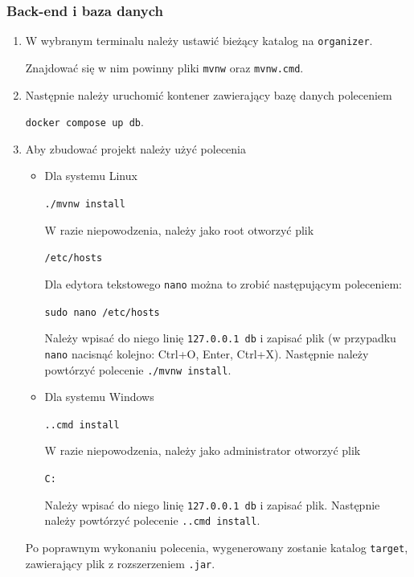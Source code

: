 \documentclass[a4paper,twoside,12pt]{book}
\begin{document}
\subsubsection{Back-end i baza danych}
\begin{enumerate}
   \item W wybranym terminalu należy ustawić bieżący katalog na \texttt{organizer}. 

Znajdować się w nim powinny pliki \texttt{mvnw} oraz \texttt{mvnw.cmd}.
   \item Następnie należy uruchomić kontener zawierający bazę danych poleceniem 

\texttt{docker compose up db}.
   \item Aby zbudować projekt należy użyć polecenia 

   \begin{itemize}
	\item Dla systemu Linux

	\texttt{./mvnw install}
  
  W razie niepowodzenia, należy jako root otworzyć plik 
  
  \texttt{/etc/hosts} 
  
  Dla edytora tekstowego \texttt{nano} można to zrobić następującym poleceniem:
  
  \texttt{sudo nano /etc/hosts} 
  
  Należy wpisać do niego linię \texttt{127.0.0.1 db} i zapisać plik (w przypadku \texttt{nano} nacisnąć kolejno: Ctrl+O, Enter, Ctrl+X). Następnie należy powtórzyć polecenie \texttt{./mvnw install}.

	\item Dla systemu Windows

	\texttt{.\mvnw.cmd install}

	W razie niepowodzenia, należy jako administrator otworzyć plik 
  
  \texttt{C:\Windows{}\drivers\etc\hosts} 
  
  Należy wpisać do niego linię \texttt{127.0.0.1 db} i zapisać plik. Następnie należy powtórzyć polecenie \texttt{.\mvnw.cmd install}.
\end{itemize}

 Po poprawnym wykonaniu polecenia, wygenerowany zostanie katalog \texttt{target}, zawierający plik z rozszerzeniem \texttt{.jar}.


\end{enumerate}
\end{document}
